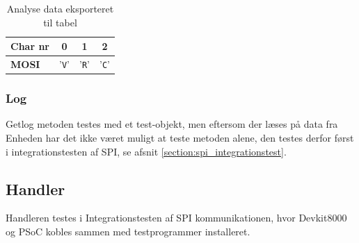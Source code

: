 \begin{table}[H]
	\caption{Analyse data eksporteret til tabel}
	\centering
	\begin{tabular}{|l|c|c|c|}
		\hline 
		\textbf{Char nr} & \textbf{0} & \textbf{1} & \textbf{2}\\ 		
		\hline 
		\textbf{MOSI} & '\verb+V+' & '\verb+R+'  & '\verb+C+'\\ 
		\hline 
	\end{tabular} 
	\label{table:mt_verify}
\end{table}


\subsubsection*{Log}
Getlog metoden testes med et test-objekt, men eftersom der læses på data fra Enheden har det ikke været muligt at teste metoden alene, den testes derfor først i integrationstesten af SPI, se afsnit \ref{section:spi_integrationstest}.

\subsection{Handler}

Handleren testes i Integrationstesten af SPI kommunikationen, hvor Devkit8000 og PSoC kobles sammen med testprogrammer installeret.